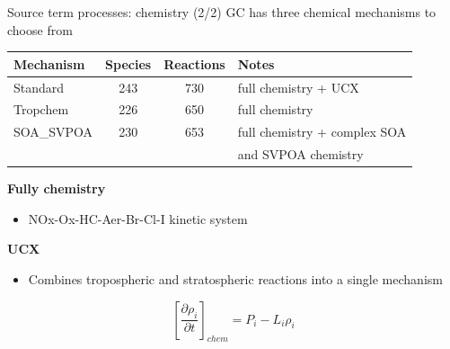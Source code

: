 \documentclass[10pt]{beamer}
\begin{document}
\begin{frame}[fragile]{Source term processes: chemistry (2/2)}
    GC has three chemical mechanisms to choose from
    
    \small
    \begin{table}[]
    \begin{tabular}{lccl}
        \hline
        \textbf{Mechanism} & \textbf{Species} & \textbf{Reactions} & \textbf{Notes} \\ 
        \hline
        Standard & 243 & 730 & full chemistry + UCX \\ 
        Tropchem & 226 & 650 & full chemistry \\ 
        SOA\_SVPOA & 230 & 653 & full chemistry + complex SOA \\
         & & & and SVPOA chemistry \\ 
        \hline
    \end{tabular}
    \end{table}
    \begin{minipage}[c]{0.6\textwidth}
        \normalsize
        \textbf{Fully chemistry}
        \begin{itemize}
            \item NOx-Ox-HC-Aer-Br-Cl-I kinetic system
        \end{itemize}
        
        \textbf{UCX}
        \begin{itemize}
            \item Combines tropospheric and stratospheric reactions into a single mechanism
        \end{itemize}
    \end{minipage}
    \begin{minipage}[c]{0.34\textwidth}
        $$
            \left[ \frac{\partial \rho_i}{\partial t} \right]_{chem} = P_i - L_i \rho_i
        $$
    \end{minipage}
\end{frame}
\end{document}
